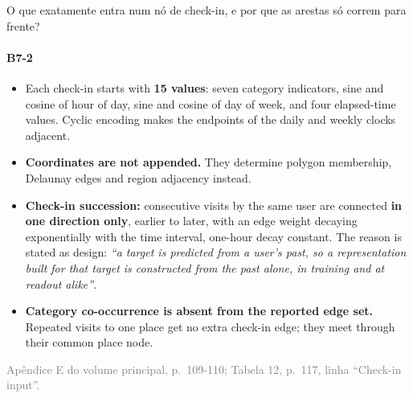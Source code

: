 \documentclass{beamer}
\begin{document}
\begin{frame}[noframenumbering]{O que exatamente entra num nó de check-in, e por que as arestas só correm para frente?}
    \framesubtitle{B7-2}
    \hypertarget{b72}{}
    \small\begin{itemize}\setlength{\itemsep}{0pt}\setlength{\parskip}{0pt}
        \item Each check-in starts with \textbf{15 values}: seven category indicators, sine and cosine of hour of day, sine and cosine of day of week, and four elapsed-time values. Cyclic encoding makes the endpoints of the daily and weekly clocks adjacent.
        \item \textbf{Coordinates are not appended.} They determine polygon membership, Delaunay edges and region adjacency instead.
        \item \textbf{Check-in succession:} consecutive visits by the same user are connected \textbf{in one direction only}, earlier to later, with an edge weight decaying exponentially with the time interval, one-hour decay constant. The reason is stated as design: \textit{``a target is predicted from a user's past, so a representation built for that target is constructed from the past alone, in training and at readout alike''}.
        \item \textbf{Category co-occurrence is absent from the reported edge set.} Repeated visits to one place get no extra check-in edge; they meet through their common place node.
    \end{itemize}
    \vfill
    {\scriptsize
    \begin{minipage}[b]{0.775\linewidth}\raggedright\textcolor{gray}{Apêndice E do volume principal, p.~109-110; Tabela 12, p.~117, linha ``Check-in input''.}\end{minipage}\hfill
    \begin{minipage}[b]{0.20\linewidth}\raggedleft \hyperlink{b0}{}\end{minipage}}
\end{frame}
\end{document}
